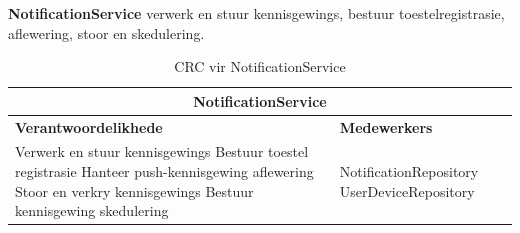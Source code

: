 \textbf{NotificationService} verwerk en stuur kennisgewings, bestuur toestelregistrasie, aflewering, stoor en skedulering.
\begin{table}[H]\centering\begin{tabular}{|p{}|p{}|}
    \hline
    \multicolumn{2}{|c|}{\textbf{NotificationService}} \\
    \hline
    \textbf{Verantwoordelikhede} & \textbf{Medewerkers} \\
    \hline
    Verwerk en stuur kennisgewings \newline
    Bestuur toestel registrasie \newline
    Hanteer push-kennisgewing aflewering \newline
    Stoor en verkry kennisgewings \newline
    Bestuur kennisgewing skedulering
    &
    NotificationRepository \newline
    UserDeviceRepository \\
    \hline
\end{tabular}
\caption{CRC vir NotificationService}
\label{tab:crc_notification_service}
\end{table}

